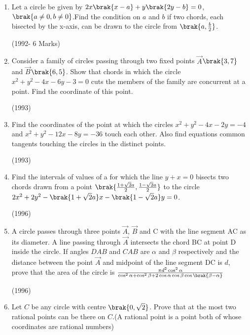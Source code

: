 \begin{enumerate}
\hfill {}
	\item Let a circle be given by $2x\brak{x-a}+y\brak{2y-b}=0$, $\brak{a\neq0, b\neq0}$.Find the condition on $a$ and $b$ if two chords,  each bisected by the x-axis, can be drawn to the circle from $\brak{a, \frac{b}{2}}$.                         

\hfill(1992- 6 Marks)




\item Consider a family of circles passing through two fixed points $\vec{A}$$\brak{3, 7}$ and $\vec{B}$$\brak{6, 5}$. Show that chords in which the circle $x^2+y^2-4x-6y-3=0$ cuts the members of the family are concurrent at a point. Find the coordinate of this point.
	        
\hfill(1993)





\item Find the coordinates of the point at which the circles $x^2+y^2-4x-2y=-4$ and $x^2+y^2-12x-8y=-36$ touch each other. Also find equations common tangents touching the circles in the distinct points.                        

\hfill(1993)


\item Find the intervals of values of a for which the line $y+x=0$ bisects two chords drawn from a point $\brak {\frac{1+\sqrt{2}a}{2}, \frac{1-\sqrt{2}a}{2}}$ to the circle $2x^2+2y^2-\brak{1+\sqrt{2}a}x-\brak{1-\sqrt{2}a}y=0$.  

\hfill(1996)





\item A circle passes through three points $\vec{A}$, $\vec{B}$ and C with the line segment AC as its diameter. A line passing through $\vec{A}$ intersects the chord BC at point D inside the circle. If angles $DAB$ and $CAB$ are $\alpha$ and $\beta$ respectively and the distance between the point $\vec{A}$ and midpoint of the line segment DC is $d$,  prove that the area of the circle is $\frac{\pi d^2 \cos^2{\alpha} }{\cos^2{\alpha}+\cos^2{\beta}+ 2\cos{\alpha} \cos{\beta} \cos{\brak{\beta-\alpha}}}$                

\hfill(1996)





\item Let $C$ be any circle with centre $\brak{0, \sqrt{2}}$. Prove that at the most two rational points can be there on $C$.(A rational point is a point both of whose coordinates are rational numbers)
	           

\end{enumerate}
